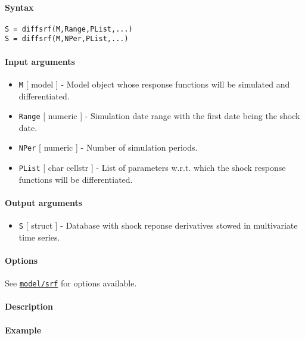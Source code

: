 


	\paragraph{Syntax}\label{syntax}

\begin{verbatim}
S = diffsrf(M,Range,PList,...)
S = diffsrf(M,NPer,PList,...)
\end{verbatim}

\paragraph{Input arguments}\label{input-arguments}

\begin{itemize}
\item
  \texttt{M} {[} model {]} - Model object whose response functions will
  be simulated and differentiated.
\item
  \texttt{Range} {[} numeric {]} - Simulation date range with the first
  date being the shock date.
\item
  \texttt{NPer} {[} numeric {]} - Number of simulation periods.
\item
  \texttt{PList} {[} char \textbar{} cellstr {]} - List of parameters
  w.r.t. which the shock response functions will be differentiated.
\end{itemize}

\paragraph{Output arguments}\label{output-arguments}

\begin{itemize}
\itemsep1pt\parskip0pt
\item
  \texttt{S} {[} struct {]} - Database with shock reponse derivatives
  stowed in multivariate time series.
\end{itemize}

\paragraph{Options}\label{options}

See \href{model/srf}{\texttt{model/srf}} for options available.

\paragraph{Description}\label{description}

\paragraph{Example}\label{example}


